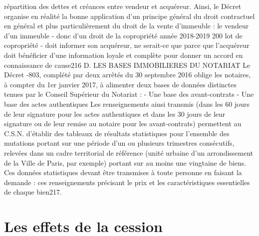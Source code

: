 	répartition des dettes et créances entre vendeur et acquéreur.
	Ainsi, le Décret organise en réalité la bonne application d'un principe général du droit contractuel en
	général et plus particulièrement du droit de la vente d'immeuble : le vendeur d'un immeuble - donc d'un
	droit de la copropriété année 2018-2019
	200
	lot de copropriété - doit informer son acquéreur, ne serait-ce que parce que l'acquéreur doit bénéficier
	d'une information loyale et complète pour donner un accord en connaissance de cause216
	D. LES BASES IMMOBILIERES DU NOTARIAT
	Le Décret -803, complété par deux arrêtés du 30 septembre 2016 oblige les notaires, à compter du
	1er janvier 2017, à alimenter deux bases de données distinctes tenues par le Conseil Supérieur du Notariat
	:
	- Une base des avant-contrats
	- Une base des actes authentiques
	Les renseignements ainsi transmis (dans les 60 jours de leur signature pour les actes authentiques et dans
	les 30 jours de leur signature ou de leur remise au notaire pour les avant-contrats) permettent au C.S.N.
	d’établir des tableaux de résultats statistiques pour l’ensemble des mutations portant sur une période
	d’un ou plusieurs trimestres consécutifs, relevées dans un cadre territorial de référence (unité urbaine
	d’un arrondissement de la Ville de Paris, par exemple) portant sur au moins une vingtaine de biens. Ces
	données statistiques devant être transmises à toute personne en faisant la demande : ces renseignements
	précisant le prix et les caractéristiques essentielles de chaque bien217.

\section{Les effets de la cession}

